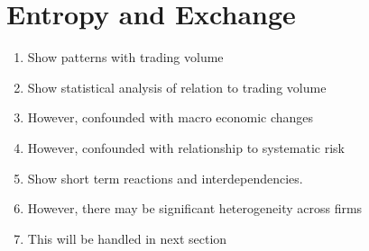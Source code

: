 \section{Entropy and Exchange}
\begin{enumerate}
  \item Show patterns with trading volume
  \item Show statistical analysis of relation to trading volume
  \item However, confounded with macro economic changes
  \item However, confounded with relationship to systematic risk
  \item Show short term reactions and interdependencies.
  \item However, there may be significant heterogeneity across firms
  \item This will be handled in next section
 \end{enumerate}


